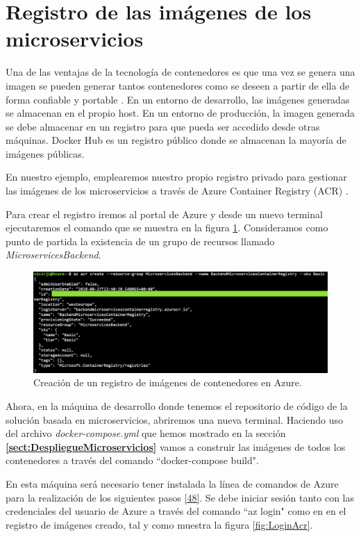 \documentclass[11pt,spanish,listoffigures]{tfgetsinf}
\begin{document}
\section{Registro de las imágenes de los microservicios}

Una de las ventajas de la tecnología de contenedores es que una vez se genera una imagen se pueden generar tantos contenedores como se deseen a partir de ella de forma confiable y portable \cite{Matthias}. En un entorno de desarrollo, las imágenes generadas se almacenan en el propio host. En un entorno de producción, la imagen generada se debe almacenar en un registro para que pueda ser accedido desde otras máquinas. Docker Hub es un registro público donde se almacenan la mayoría de imágenes públicas.

En nuestro ejemplo, emplearemos nuestro propio registro privado para gestionar las imágenes de los microservicios a través de Azure Container Registry (ACR) \cite{DelaTorre2018}.

Para crear el registro iremos al portal de Azure y desde un nuevo terminal ejecutaremos el comando que se muestra en la figura \ref{fig:CreateACR}. Consideramos como punto de partida la existencia de un grupo de recursos llamado \textit{MicroservicesBackend}.

\begin{figure}[h]
\centering
\includegraphics[scale=0.50]{CreateACR}
\caption{Creación de un registro de imágenes de contenedores en Azure.}
\label{fig:CreateACR}
\end{figure}

Ahora, en la máquina de desarrollo donde tenemos el repositorio de código de la solución basada en microservicios, abriremos una nueva terminal. Haciendo uso del archivo \textit{docker-compose.yml} que hemos mostrado en la sección \textbf{\ref{sect:DespliegueMicroservicios} } vamos a construir las imágenes de todos los contenedores a través del comando ``docker-compose build".

En esta máquina será necesario tener instalada la línea de comandos de Azure para la realización de los siguientes pasos 
\hyperlink{page.80}{[48]}. Se debe iniciar sesión tanto con las credenciales del usuario de Azure a través del comando ``az login" como en en el registro de imágenes creado, tal y como muestra la figura \ref{fig:LoginAcr}.
\end{document}
